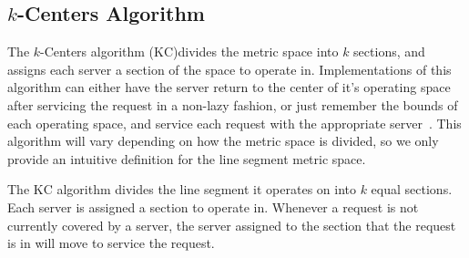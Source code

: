 \subsection{$k$-Centers Algorithm}
\label{sec:KC}
The $k$-Centers algorithm ($\mathrm{KC}$)divides the metric space into $k$ sections, and assigns each server a section of the space to operate in. Implementations of this algorithm can either have the server return to the center of it's operating space after servicing the request in a non-lazy fashion, or just remember the bounds of each operating space, and service each request with the appropriate server~\cite{bij2016}. This algorithm will vary depending on how the metric space is divided, so we only provide an intuitive definition for the line segment metric space.

\begin{definition}
    The $\mathrm{KC}$ algorithm divides the line segment it operates on into $k$ equal sections. Each server is assigned a section to operate in. Whenever a request is not currently covered by a server, the server assigned to the section that the request is in will move to service the request.
\end{definition}